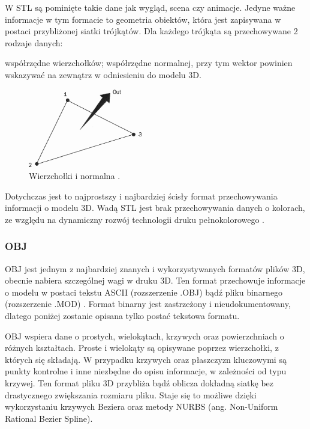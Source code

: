 W STL są pominięte takie dane jak wygląd, scena czy animacje. Jedyne ważne informacje w tym formacie to geometria obiektów, która jest zapisywana w postaci przybliżonej siatki trójkątów. Dla każdego trójkąta są przechowywane 2 rodzaje danych:
\begin{itemize}
\itemi współrzędne wierzchołków;
\itemi współrzędne normalnej, przy tym wektor powinien wskazywać na zewnątrz w odniesieniu do modelu 3D.
\end{itemize}
\begin{figure}[H]
		\centering
 		\includegraphics[width=5.0cm]{vertices-and-normal.png}
    	\caption{Wierzchołki i normalna \cite{stlinfo}.}
 		\label{rys6}
\end{figure}
Dotychczas jest to najprostszy i najbardziej ścisły format przechowywania informacji o modelu 3D. Wadą STL jest brak przechowywania danych o kolorach, ze względu na dynamiczny rozwój technologii druku pełnokolorowego \cite{stlinfo}.

\subsubsection{OBJ}
OBJ jest jednym z najbardziej znanych i wykorzystywanych formatów plików 3D, obecnie nabiera szczególnej wagi w druku 3D. Ten format przechowuje informacje o modelu w postaci tekstu ASCII (rozszerzenie .OBJ) bądź pliku binarnego (rozszerzenie .MOD) \cite{objinfo}.
Format binarny jest zastrzeżony i nieudokumentowany, dlatego poniżej zostanie opisana tylko postać tekstowa formatu.

OBJ wspiera dane o prostych, wielokątach, krzywych oraz powierzchniach o różnych kształtach. Proste i wielokąty są opisywane poprzez wierzchołki, z których się składają. W przypadku krzywych oraz płaszczyzn kluczowymi są punkty kontrolne i inne niezbędne do opisu informacje, w zależności od typu krzywej. Ten format pliku 3D przybliża bądź oblicza dokładną siatkę bez drastycznego zwiększania rozmiaru pliku. Staje się to możliwe dzięki wykorzystaniu krzywych Beziera oraz metody NURBS (ang. Non-Uniform Rational Bezier Spline).

